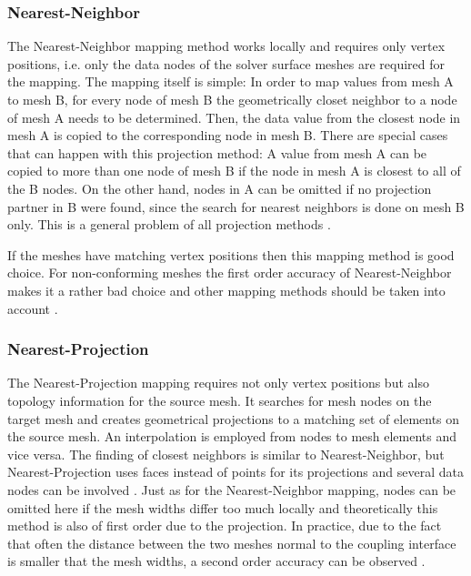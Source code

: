   \subsubsection{Nearest-Neighbor}
   The Nearest-Neighbor mapping method works locally and requires only vertex positions, i.e. only the data nodes of the solver surface meshes are required for the mapping. The mapping itself is simple: In order to map values from mesh A to mesh B, for every node of mesh B the geometrically closet neighbor to a node of mesh A needs to be determined. Then, the data value from the closest node in mesh A is copied to the corresponding node in mesh B. There are special cases that can happen with this projection method: A value from mesh A can be copied to more than one node of mesh B if the node in mesh A is closest to all of the B nodes. On the other hand, nodes in A can be omitted if no projection partner in B were found, since the search for nearest neighbors is done on mesh B only. This is a general problem of all projection methods \cite{gatzhammer2015efficient}.
   
   If the meshes have matching vertex positions then this mapping method is good choice. For non-conforming meshes the first order accuracy of Nearest-Neighbor makes it a rather bad choice and other mapping methods should be taken into account \cite{bungartz2015fully}.
  
  \subsubsection{Nearest-Projection}
   The Nearest-Projection mapping requires not only vertex positions but also topology information for the source mesh. It searches for mesh nodes on the target mesh and creates geometrical projections to a matching set of elements on the source mesh. An interpolation is employed from nodes to mesh elements and vice versa. The finding of closest neighbors is similar to Nearest-Neighbor, but Nearest-Projection uses faces instead of points for its projections and several data nodes can be involved \cite{gatzhammer2015efficient}. Just as for the Nearest-Neighbor mapping, nodes can be omitted here if the mesh widths differ too much locally and theoretically this method is also of first order due to the projection. In practice, due to the fact that often the distance between the two meshes normal to the coupling interface is smaller that the mesh widths, a second order accuracy can be observed \cite{bungartz2015fully}.
  
